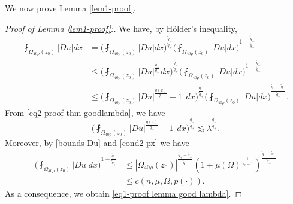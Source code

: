 \documentclass[a4paper,10pt]{amsart}
\newcommand{\lesi}{\lesssim}
\newcommand{\f}{\frac}
\newcommand{\Om}{\Omega}
\begin{document}
	
	We now prove Lemma \ref{lem1-proof}.
	
	\begin{proof}[Proof of Lemma \ref{lem1-proof}:]
		We have, by H\"older's inequality,
		$$
		\begin{aligned}
		\fint_{\Om_{40\rho}(z_0)}|Du|dx&= \Big(\fint_{\Om_{40\rho}(z_0)}|Du|dx\Big)^{\f{\tilde{q}_-}{\tilde{q}_+}}\Big(\fint_{\Om_{40\rho}(z_0)}|Du|dx\Big)^{1-\f{\tilde{q}_-}{\tilde{q}_+}}\\
		&\leq \Big(\fint_{\Om_{40\rho}(z_0)}|Du|^{\f{\tilde{q}_-}{q_-}}dx\Big)^{\f{q_-}{\tilde{q}_+}}\Big(\fint_{\Om_{40\rho}(z_0)}|Du|dx\Big)^{1-\f{\tilde{q}_-}{\tilde{q}_+}}\\
		&\leq \Big(\fint_{\Om_{40\rho}(z_0)}|Du|^{\f{q(x)}{q_-}}+1 \ \ dx\Big)^{\f{q_-}{\tilde{q}_+}}\Big(\fint_{\Om_{40\rho}(z_0)}|Du|dx\Big)^{\f{\tilde{q}_+-\tilde{q}_-}{\tilde{q}_+}}.
		\end{aligned}
		$$
		From \eqref{eq2-proof thm goodlambda}, we have
		$$
		\Big(\fint_{\Om_{40\rho}(z_0)}|Du|^{\f{q(x)}{q_-}}+1 \ \ dx\Big)^{\f{q_-}{\tilde{q}_+}}\lesi \lambda^{\f{q_-}{\tilde{q}_+}}.
		$$
		Moreover, by \eqref{bounds-Du} and \eqref{cond2-px} we have
		$$
		\begin{aligned}
		\Big(\fint_{\Om_{40\rho}(z_0)}|Du|dx\Big)^{1-\f{\tilde{q}_-}{\tilde{q}_+}}&\leq |\Om_{40\rho}(z_0)|^{\f{\tilde{q}_+-\tilde{q}_-}{\tilde{q}_+}}(1+\mu(\Om)^{\f{1}{\gamma_2-1}})^\f{\tilde{q}_+-\tilde{q}_-}{\tilde{q}_+}\\
		&\leq c(n,\mu,\Om, p(\cdot)).
		\end{aligned}
		$$
		As a consequence, we obtain \eqref{eq1-proof lemma good lambda}.
		
		\medskip
		

\end{proof}
\end{document}
